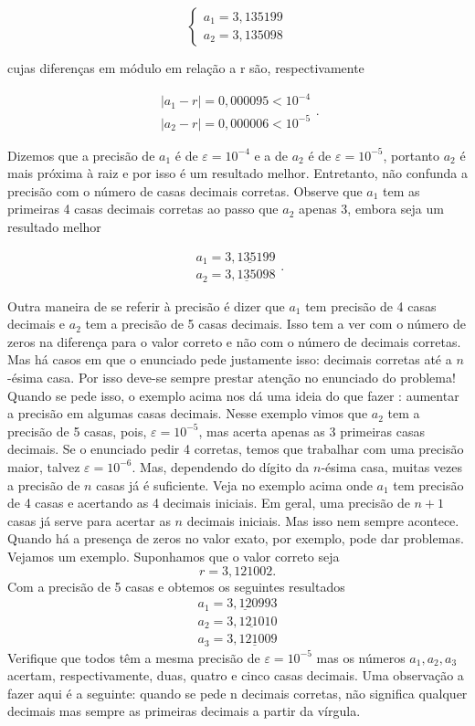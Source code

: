 \documentclass[
  letterpaper,
  DIV=11,
  numbers=noendperiod]{scrreprt}
\begin{document}
\[\left\{\begin{matrix}
a_1 = 3,135199\\
a_2 = 3,135098
\end{matrix}\right.\]

cujas diferenças em módulo em relação a r são, respectivamente

\[\begin{array}{c}|a_{1}-r|=0,000095<10^{-4}\\|a_{2}-r|=0,000006<10^{-5}\end{array}.\]

Dizemos que a precisão de \(a_{1}\) é de \(\varepsilon=10^{-4}\) e a de
\(a_{2}\) é de \(\varepsilon=10^{-5}\), portanto \(a_{2}\) é mais
próxima à raiz e por isso é um resultado melhor. Entretanto, não
confunda a precisão com o número de casas decimais corretas. Observe que
\(a_{1}\) tem as primeiras 4 casas decimais corretas ao passo que
\(a_{2}\) apenas 3, embora seja um resultado melhor

\[\begin{array}{c}a_{1}=3,\underline{1351}99\\a_{2}=3,\underline{135}098\end{array}.\]

Outra maneira de se referir à precisão é dizer que \(a_{1}\) tem
precisão de 4 casas decimais e \(a_{2}\) tem a precisão de 5 casas
decimais. Isso tem a ver com o número de zeros na diferença para o valor
correto e não com o número de decimais corretas. Mas há casos em que o
enunciado pede justamente isso: decimais corretas até a \(n\)-ésima
casa. Por isso deve-se sempre prestar atenção no enunciado do problema!
Quando se pede isso, o exemplo acima nos dá uma ideia do que fazer :
aumentar a precisão em algumas casas decimais. Nesse exemplo vimos que
\(a_{2}\) tem a precisão de 5 casas, pois, \(\varepsilon=10^{-5}\), mas
acerta apenas as 3 primeiras casas decimais. Se o enunciado pedir 4
corretas, temos que trabalhar com uma precisão maior, talvez
\(\varepsilon=10^{-6}\). Mas, dependendo do dígito da \(n\)-ésima casa,
muitas vezes a precisão de \(n\) casas já é suficiente. Veja no exemplo
acima onde \(a_{1}\) tem precisão de 4 casas e acertando as 4 decimais
iniciais. Em geral, uma precisão de \(n+1\) casas já serve para acertar
as \(n\) decimais iniciais. Mas isso nem sempre acontece. Quando há a
presença de zeros no valor exato, por exemplo, pode dar problemas.
Vejamos um exemplo. Suponhamos que o valor correto seja \[r=3,121002.\]
Com a precisão de 5 casas e obtemos os seguintes resultados
\[\begin{array}{c}a_{1}=3,\underline{12}0993\\a_{2}=3,\underline{1210}10\\a_{3}=3,\underline{12100}9\end{array}\]
Verifique que todos têm a mesma precisão de \(\varepsilon=10^{-5}\) mas
os números \(a_{1},a_{2},a_{3}\) acertam, respectivamente, duas, quatro
e cinco casas decimais. Uma observação a fazer aqui é a seguinte: quando
se pede n decimais corretas, não significa qualquer decimais mas sempre
as primeiras decimais a partir da vírgula.
\end{document}
